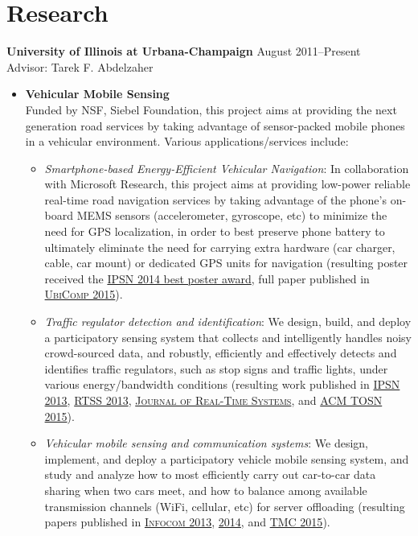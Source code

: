 \section{\sc Research} {\bf University of Illinois at Urbana-Champaign} \hfill August 2011--Present\\
Advisor: Tarek F. Abdelzaher
\begin{itemize}
\item \textbf{Vehicular Mobile Sensing}\\
Funded by NSF, Siebel Foundation, this project aims at providing the next generation road services by taking advantage of sensor-packed mobile phones in a vehicular environment. Various applications/services include:
\begin{itemize}

\item {\em Smartphone-based Energy-Efficient Vehicular Navigation}: In collaboration with Microsoft Research, this project aims at providing low-power reliable real-time road navigation services by taking advantage of the phone's on-board MEMS sensors (accelerometer, gyroscope, etc) to minimize the need for GPS localization, in order to best preserve phone battery to ultimately eliminate the need for carrying extra hardware (car charger, cable, car mount) or dedicated GPS units for navigation (resulting poster received the \hyperlink{hu2014ipsn}{IPSN 2014 best poster award}, full paper published in \hyperlink{hu2015ubicomp}{\textsc{UbiComp 2015}}).

\item {\em Traffic regulator detection and identification}: We design, build, and deploy a participatory sensing system that collects and intelligently handles noisy crowd-sourced data, and robustly, efficiently and effectively detects and identifies traffic regulators, such as stop signs and traffic lights, under various energy/bandwidth conditions (resulting work published in \hyperlink{hu2013ipsn}{\textsc{IPSN 2013}}, \hyperlink{wang2013rtss}{\textsc{RTSS 2013}}, \hyperlink{wang2015jrts}{\textsc{Journal of Real-Time Systems}}, and \hyperlink{hu2015tosn}{\textsc{ACM TOSN 2015}}).

\item {\em Vehicular mobile sensing and communication systems}: We design, implement, and deploy a participatory vehicle mobile sensing system, and study and analyze how to most efficiently carry out car-to-car data sharing when two cars meet, and how to balance among available transmission channels (WiFi, cellular, etc) for server offloading (resulting papers published in \hyperlink{liu2013infocom}{\textsc{Infocom 2013}}, \hyperlink{hu2014infocom}{\textsc{2014}}, and \hyperlink{hu2015tmc}{\textsc{TMC 2015}}).


\end{itemize}
\end{itemize}

